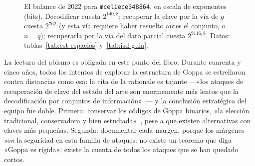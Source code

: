 \begin{figure}[htbp]
\centering
{}
\caption{El balance de 2022 para \texttt{mceliece348864}, en escala
de exponentes (bits). Decodificar cuesta $2^{140{,}8}$; recuperar la
clave por la vía de $g$ cuesta $2^{762}$ (y esta vía requiere haber
resuelto antes el conjunto, o $n=q$); recuperarla por la vía del
dato parcial cuesta $2^{9116{,}8}$. Datos:
tablas~\ref{tab:est-espacios} y~\ref{tab:isd-guia}.}
\label{fig:est-abismo}
\end{figure}

La lectura del abismo es obligada en este punto del libro. Durante
cuarenta y cinco años, todos los intentos de explotar la estructura
de Goppa se estrellaron contra distancias como esa: la cita de la
rationale es tajante ---«los ataques de recuperación de clave del
estado del arte son enormemente más lentos que la decodificación por
conjuntos de información»~\cite{cmrationale}--- y la conclusión
estratégica del equipo fue doble. Primera: conservar los códigos de
Goppa binarios, «la elección tradicional, conservadora y bien
estudiada»~\cite{cmrationale}, pese a que existen alternativas con
claves más pequeñas. Segunda: documentar cada margen, porque los
márgenes \emph{son} la seguridad en esta familia de ataques: no
existe un teorema que diga «Goppa es rígida»; existe la cuenta de
todos los ataques que se han quedado cortos.

